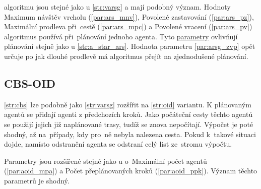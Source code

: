  algoritmu jsou stejné jako u \ref{str:varsg} a mají podobný význam.
Hodnoty Maximum návštěv vrcholu (\ref{par:ars_mnv}), Povolené zastavování (\ref{par:ars_pz}),
Maximální prodleva při~cestě (\ref{par:ars_mpc}) a Povolené vracení (\ref{par:ars_pv})
algoritmus používá při~plánování jednoho agenta.
Tyto \hyperref[subsubsec:ars_parametry]{parametry} ovlivňují plánování stejně jako u \ref{str:a_star_ars}.
Hodnota parametru \ref{par:arsg_zvp} opět určuje po jak dlouhé prodlevě má algoritmus přejít na zjednodušené plánování.

\subsection{CBS-OID}\label{subsec:cbsoid}

\ref{str:cbs} lze podobně jako \ref{str:varsg} rozšířit na \ref{str:oid} variantu.
K plánovaným agentů se přidají agenti z předchozích kroků.
Jako počáteční cesty těchto agentů se použijí jejich již naplánované trasy, tudíž se znova nepočítají.
Výpočet je poté shodný, až na~případy, kdy pro~ně nebyla nalezena cesta.
Pokud k~takové situaci dojde, namísto odstranění agenta se odstraní celý list ze~stromu výpočtu.

Parametry jsou rozšířené stejně jako u  o~Maximální počet agentů (\ref{par:aoid_mpa})
a Počet přeplánovaných kroků (\ref{par:aoid_ppk}).
Význam těchto parametrů je shodný.
